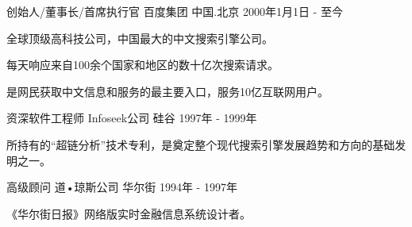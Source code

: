 

\begin{cventries}

  \cventry
    {创始人/董事长/首席执行官} %
    {百度集团} %
    {中国.北京} %
    {2000年1月1日 - 至今} %
    {
      \begin{cvitems} %
        \item {全球顶级高科技公司，中国最大的中文搜索引擎公司。}
        \item {每天响应来自100余个国家和地区的数十亿次搜索请求。}
        \item {是网民获取中文信息和服务的最主要入口，服务10亿互联网用户。}
      \end{cvitems}
    }

  \cventry
    {资深软件工程师} %
    {Infoseek公司} %
    {硅谷} %
    {1997年 - 1999年} %
    {
      \begin{cvitems} %
        \item {所持有的“超链分析”技术专利，是奠定整个现代搜索引擎发展趋势和方向的基础发明之一。}
      \end{cvitems}
    }
  \cventry
    {高级顾问} %
    {道•琼斯公司} %
    {华尔街} %
    {1994年 - 1997年} %
    {
      \begin{cvitems} %
        \item {《华尔街日报》网络版实时金融信息系统设计者。}
      \end{cvitems}
    }

\end{cventries}
